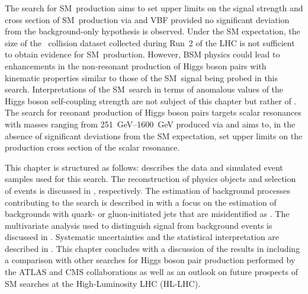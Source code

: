The search for SM~\HH production aims to set upper limits on the signal strength
and cross section of SM~\HH production via \ggF and VBF provided no significant
deviation from the background-only hypothesis is observed. Under the SM
expectation, the size of the \pp~collision dataset collected during Run~2 of the
LHC is not sufficient to obtain evidence for SM~\HH production. However, BSM
physics could lead to enhancements in the non-resonant production of Higgs boson
pairs with kinematic properties similar to those of the SM~\HH signal being
probed in this search. Interpretations of the SM~\HH search in terms of
anomalous values of the Higgs boson self-coupling strength are not subject of
this chapter but rather of . The search for
resonant production of Higgs boson pairs targets scalar resonances with masses
ranging from \SIrange{251}{1600}{\GeV} produced via \ggF and aims to, in the
absence of significant deviations from the SM expectation, set upper limits on
the production cross section of the scalar resonance.

This chapter is structured as follows:  describes
the data and simulated event samples used for this search. The reconstruction of
physics objects and selection of events is discussed in
, respectively. The
estimation of background processes contributing to the search is described in
 with a focus on the estimation of backgrounds
with quark- or gluon-initiated jets that are misidentified as \tauhadvis. The
multivariate analysis used to distinguish signal from background events is
discussed in . Systematic uncertainties and the
statistical interpretation are described in
. This chapter concludes with a
discussion of the results in  including a comparison
with other searches for Higgs boson pair production performed by the ATLAS and
CMS collaborations as well as an outlook on future prospects of SM \HH searches
at the High-Luminosity LHC (HL-LHC).


